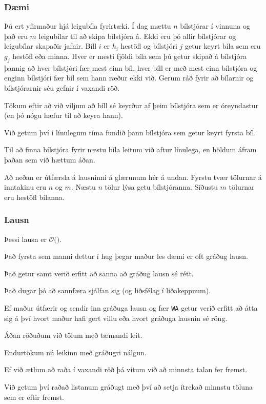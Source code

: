 {
	\frametitle{Dæmi}
	{
		\item<1-> 
			Þú ert yfirmaður hjá leigubíla fyrirtæki.
			Í dag mættu $n$ bílstjórar í vinnuna og það eru $m$ leigubílar til að skipa bílstjóra á.
			Ekki eru þó allir bílstjórar og leigubílar skapaðir jafnir.
			Bíll $i$ er $h_i$ hestöfl og bílstjóri $j$ getur keyrt bíla sem eru $g_j$ hestöfl eða minna.
			Hver er mesti fjöldi bíla sem þú getur skipað á bílstjóra
				þannig að hver bílstjóri fær mest einn bíl,
				hver bíll er með mest einn bílstjóra og
				enginn bílstjóri fær bíl sem hann ræður ekki við.
			Gerum ráð fyrir að bílarnir og bílstjórarnir séu gefnir í vaxandi röð.
		\item<2-> Tökum eftir að við viljum að bíll sé keyrður af þeim bílstjóra sem er óreyndastur (en þó nógu hæfur til að keyra hann).
		\item<4-> Við getum því í línulegum tíma fundið þann bílstjóra sem getur keyrt fyrsta bíl.
		\item<5-> Til að finna bílstjóra fyrir næstu bíla leitum við aftur línulega, en höldum áfram þaðan sem við hættum áðan.
	}
}

{
	Að neðan er útfærsla á lausninni á glærunum hér á undan. Fyrstu tvær tölurnar á inntakinu eru $n$ og $m$. 
		Næstu $n$ tölur lýsa getu bílstjóranna.
		Síðustu $m$ tölurnar eru hestöfl bílanna.
}

{
	\frametitle{Lausn}
	{
		\item<1-> Þessi lausn er $\mathcal{O}($\onslide<2->{$n + m$}$)$.
	}
}

{
	{
		\item<1-> Það fyrsta sem manni dettur í hug þegar maður les dæmi er oft gráðug lausn.
		\item<2-> Það getur samt verið erfitt að sanna að gráðug lausn sé rétt.
		\item<3-> Það dugar þó að sannfæra sjálfan sig (og liðsfélag í liðakeppnum).
		\item<4-> Ef maður útfærir og sendir inn gráðuga lausn og fær \texttt{WA}
					getur verið erfitt að átta sig á því hvort maður hafi gert villu eða hvort gráðuga lausnin sé röng.
	}
}

{
	{
		\item<1-> Áðan röðuðum við tölum með tæmandi leit.
		\item<2-> Endurtökum nú leikinn með gráðugri nálgun.
		\item<3-> Ef við ætlum að raða í vaxandi röð þá vitum við að minnsta talan fer fremst.
		\item<4-> Við getum því raðað listanum gráðugt með því að setja ítrekað minnstu töluna sem er eftir fremst.
	}
}

